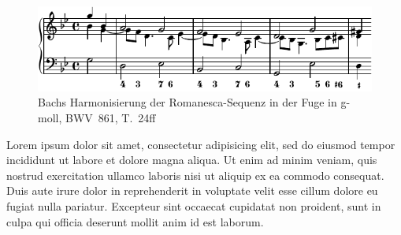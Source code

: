 \begin{figure}[htbp]
	\centering
	\includegraphics{lilypond/g-moll/render/romanesca-vorhalte}
	\caption{Bachs Harmonisierung der Romanesca-Sequenz in der Fuge in g-moll, BWV~861, T.~24ff}
	\label{fig:bwv681-vorhalte}
\end{figure}

Lorem ipsum dolor sit amet, consectetur adipisicing elit, sed do eiusmod tempor incididunt ut labore et dolore magna aliqua. Ut enim ad minim veniam, quis nostrud exercitation ullamco laboris nisi ut aliquip ex ea commodo consequat. Duis aute irure dolor in reprehenderit in voluptate velit esse cillum dolore eu fugiat nulla pariatur. Excepteur sint occaecat cupidatat non proident, sunt in culpa qui officia deserunt mollit anim id est laborum.

